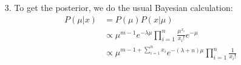 \documentclass[11pt]{article}
\theoremstyle{definition}
\begin{document}
\begin{itemize}
    
    \item[3.]
        To get the posterior, we do the usual Bayesian calculation:
        \begin{align*}
            P(\mu|x) &=  P(\mu) P(x|\mu) \\
                     &\propto \mu^{m-1}e^{-\lambda \mu} \prod_{i=1}^n \frac{\mu^{x_i}}{x_i!}e^{-\mu} \\
                     &\propto \mu^{m-1+\sum_{i=1}^n x_i}e^{-(\lambda+n) \mu} \prod_{i=1}^n \frac{1}{x_i!} \\
        \end{align*}
\end{itemize}
\end{document}
